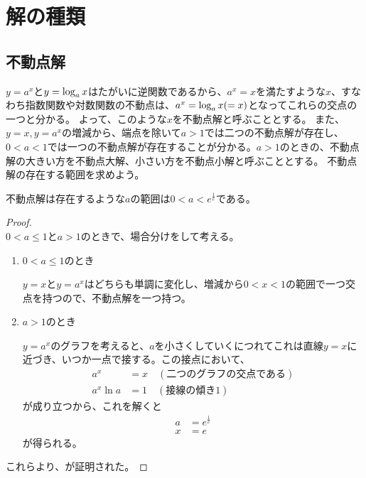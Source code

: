\section{解の種類}

\subsection{不動点解}
	$y = a^x$と$y = \log_{a} x$はたがいに逆関数であるから、$a^x = x$を満たすような$x$、すなわち指数関数や対数関数の不動点は、$a^x = \log_{a} x( = x)$となってこれらの交点の一つと分かる。
	よって、このような$x$を不動点解と呼ぶこととする。
	また、$y = x,y = a^x$の増減から、端点を除いて$a > 1$では二つの不動点解が存在し、$0 < a < 1$では一つの不動点解が存在することが分かる。$a > 1$のときの、不動点解の大きい方を不動点大解、小さい方を不動点小解と呼ぶこととする。
	不動点解の存在する範囲を求めよう。
	\begin{theorem}
	\label{th:fixed_solutions}
		不動点解は存在するような$a$の範囲は$0 < a < e^\frac{1}{e}$である。
	\end{theorem}
	\begin{proof} \mbox{}\\
		$0 < a \leq 1$と$a > 1$のときで、場合分けをして考える。
		\begin{enumerate}
			\item $0 < a \leq 1$のとき
			
				$y = x$と$y = a^x$はどちらも単調に変化し、増減から$0 < x < 1$の範囲で一つ交点を持つので、不動点解を一つ持つ。
			\item $a > 1$のとき
			
				$y = a^x$のグラフを考えると、$a$を小さくしていくにつれてこれは直線$y = x$に近づき、いつか一点で接する。この接点において、
				\begin{align*}
					a^x &= x \quad (\text{二つのグラフの交点である}) \\
					a^x\ln{a} &= 1 \quad (\text{接線の傾き1})
				\end{align*}
				が成り立つから、これを解くと
				\begin{align*}
					a &= e^\frac{1}{e} \\
					x &= e 
				\end{align*}
				が得られる。
		\end{enumerate}
		これらより、が証明された。
	\end{proof}

